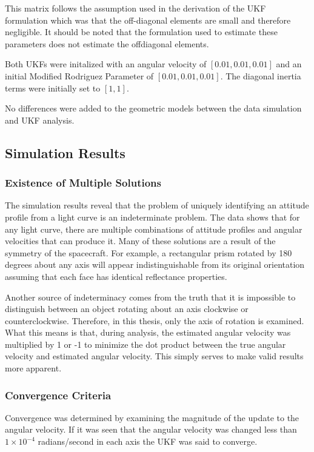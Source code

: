 This matrix follows the assumption used in the derivation of the UKF formulation which was that the off-diagonal elements are small and therefore negligible. It should be noted that the formulation used to estimate these parameters does not estimate the offdiagonal elements.

Both UKFs were initalized with an angular velocity of $[0.01, 0.01, 0.01]$ and an initial Modified Rodriguez Parameter of $[0.01, 0.01, 0.01]$. The diagonal inertia terms were initially set to $[1, 1]$.

No differences were added to the geometric models between the data simulation and UKF analysis.

\subsection{Simulation Results}

\subsubsection{Existence of Multiple Solutions}
The simulation results reveal that the problem of uniquely identifying an attitude profile from a light curve is an indeterminate problem. The data shows that for any light curve, there are multiple combinations of attitude profiles and angular velocities that can produce it. Many of these solutions are a result of the symmetry of the spacecraft. For example, a rectangular prism rotated by 180 degrees about any axis will appear indistinguishable from its original orientation assuming that each face has identical reflectance properties.

Another source of indeterminacy comes from the truth that it is impossible to distinguish between an object rotating about an axis clockwise or counterclockwise. Therefore, in this thesis, only the axis of rotation is examined. What this means is that, during analysis, the estimated angular velocity was multiplied by 1 or -1 to minimize the dot product between the true angular velocity and estimated angular velocity. This simply serves to make valid results more apparent.


\subsubsection{Convergence Criteria}
 
Convergence was determined by examining the magnitude of the update to the angular velocity. If it was seen that the angular velocity was changed less than $1\times 10^{-4}$ radians/second in each axis the UKF was said to converge.

